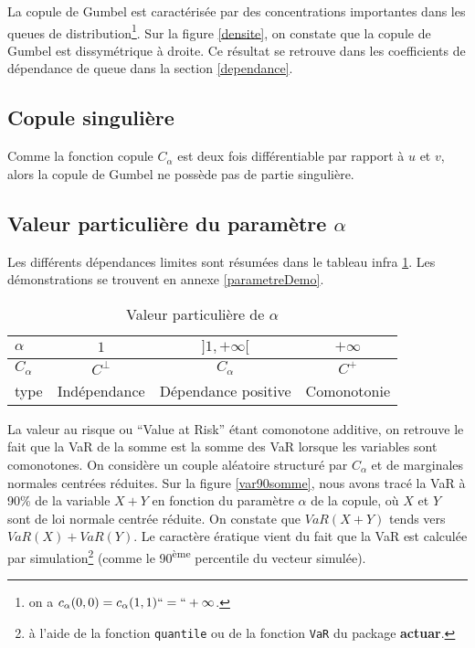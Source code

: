 \documentclass[11pt,a4paper]{article}
\newcommand{\pkg}{\textbf}
\newcommand{\code}{\texttt}
\newcommand{\expo}{\textsuperscript}
\begin{document}
\medskip

La copule de Gumbel est caract\'eris\'ee par des concentrations importantes dans les queues de distribution\footnote{on a $c_\alpha(0,0)=c_\alpha(1,1)``=``+\infty$.}. 
Sur la figure \ref{densite}, on constate que la copule de Gumbel est dissym\'etrique \`a droite. Ce r\'esultat se retrouve dans les coefficients de
d\'ependance de queue dans la section \ref{dependance}. 



\subsection{Copule singuli\`ere}

Comme la fonction copule $C_\alpha$ est deux fois diff\'erentiable par rapport \`a $u$ et $v$, alors la copule de Gumbel ne poss\`ede pas de partie singuli\`ere.

\subsection{Valeur particuli\`ere du param\`etre $\alpha$}

Les diff\'erents d\'ependances limites sont r\'esum\'ees dans le tableau infra \ref{parametre}. 
Les d\'emonstrations se trouvent en annexe \ref{parametreDemo}.
\begin{table}[!htb]
\center
\begin{tabular}{lccc}
\hline
$\alpha$ & $1$ & $]1,+\infty[$ & $+\infty$\\
\hline
$C_\alpha$ & $C^\bot$ & $C_\alpha$ & $C^+$\\
\hline
type & Ind\'ependance & D\'ependance positive & Comonotonie\\
\hline
\end {tabular}
\caption{Valeur particuli\`ere de $\alpha$}
\label{parametre}
\end{table}

La valeur au risque ou ``Value at Risk'' \'etant comonotone additive, on retrouve le fait que la VaR de la somme
est la somme des VaR lorsque les variables sont comonotones. On consid\`ere un couple al\'eatoire structur\'e
par $C_\alpha$ et de marginales normales centr\'ees r\'eduites. Sur la figure \ref{var90somme}, nous avons trac\'e la VaR
\`a 90\% de la variable $X+Y$ en fonction du param\`etre $\alpha$ de la copule, o\`u $X$ et $Y$
sont de loi normale centr\'ee r\'eduite. On constate que $VaR(X+Y)$ tends
vers $VaR(X)+VaR(Y)$. Le caract\`ere \'eratique vient du fait que la VaR est calcul\'ee par simulation\footnote{\`a l'aide 
de la fonction \code{quantile} ou de la fonction \code{VaR} du package \pkg{actuar}. } (comme le 90\expo{\`eme}
percentile du vecteur simul\'ee).
\end{document}
